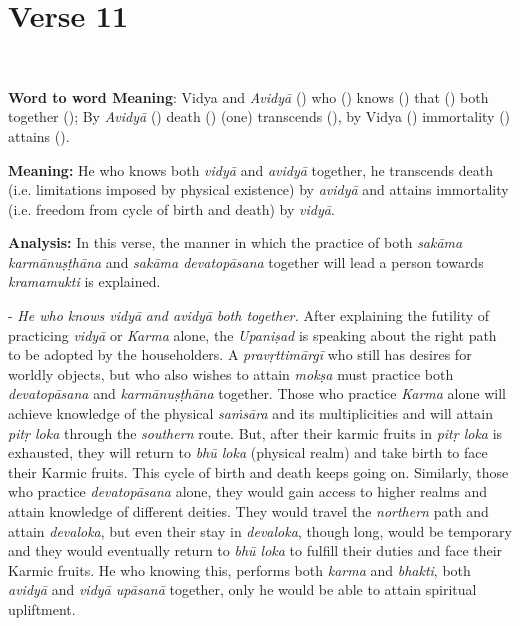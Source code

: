 \chapter{Verse 11}

\begin{moolashloka}
\\
\end{moolashloka}
\vskip 1pt

\textbf{Word to word Meaning}: Vidya and \emph{Avidyā} () who () knows () that () both together (); By \emph{Avidyā} () death () (one) transcends (), by Vidya () immortality () attains ().
\vskip 1.1pt

\textbf{Meaning:} He who knows both \emph{vidyā} and \emph{avidyā} together, he transcends death (i.e. limitations imposed by physical existence) by \emph{avidyā} and attains immortality (i.e. freedom from cycle of birth and death) by \emph{vidyā}.
\vskip 1.1pt

\textbf{Analysis:} In this verse, the manner in which the practice of both \emph{sakāma karmānuṣṭhāna} and \emph{sakāma devatopāsana} together will lead a person towards \emph{kramamukti} is explained.
\vskip 1.1pt

- \emph{He who knows vidyā} \emph{and avidyā} \emph{both together.} After explaining the futility of practicing \emph{vidyā} or \emph{Karma} alone, the \emph{Upaniṣad} is speaking about the right path to be adopted by the householders. A \emph{pravṛttimārgī} who still has desires for worldly objects, but who also wishes to attain \emph{mokṣa} must practice both \emph{devatopāsana} and \emph{karmānuṣṭhāna} together. Those who practice \emph{Karma} alone will achieve knowledge of the physical \emph{saṁsāra} and its multiplicities and will attain \emph{pitṛ loka} through the \emph{southern} route. But, after their karmic fruits in \emph{pitṛ loka} is exhausted, they will return to \emph{bhū loka} (physical realm) and take birth to face their Karmic fruits. This cycle of birth and death keeps going on. Similarly, those who practice \emph{devatopāsana} alone, they would gain access to higher realms and attain knowledge of different deities. They would travel the \emph{northern} path and attain \emph{devaloka}, but even their stay in \emph{devaloka}, though long, would be temporary and they would eventually return to \emph{bhū loka} to fulfill their duties and face their Karmic fruits. He who knowing this, performs both \emph{karma} and \emph{bhakti}, both \emph{avidyā} and \emph{vidyā upāsanā} together, only he would be able to attain spiritual upliftment.


